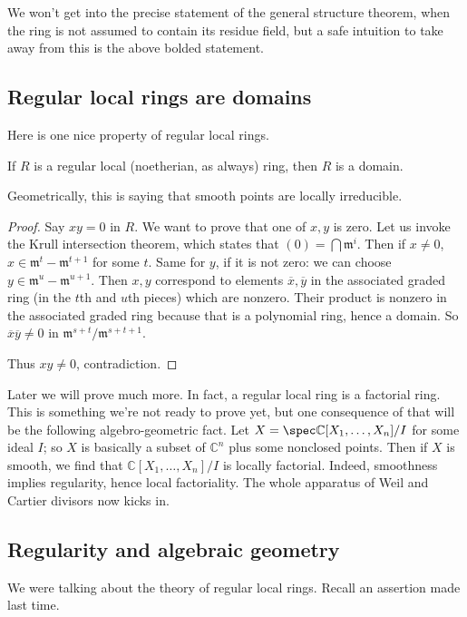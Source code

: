 We won't get into the precise statement of the general structure theorem, when
the ring is not assumed to contain its residue field, but a safe
intuition to take away from this is the above bolded statement.


\subsection{Regular local rings are domains}


Here is one nice property of regular local rings.

\begin{proposition} 
If $R$ is a regular local (noetherian, as always) ring, then $R$ is a domain.
\end{proposition} 

Geometrically, this is saying that smooth points are locally irreducible.
\begin{proof} 
Say $xy=0$ in $R$. We want to prove that one of $x,y$ is zero. Let us invoke
the Krull intersection theorem, which states that $(0) = \bigcap
\mathfrak{m}^i$. Then if $x \neq 0$, $x \in \mathfrak{m}^t -
\mathfrak{m}^{t+1}$ for some $t$. Same for $y$, if it is not zero: we can
choose $y \in \mathfrak{m}^u - \mathfrak{m}^{u+1}$. Then $x,y$ correspond to
elements $\overline{x}, \overline{y}$ in the associated graded ring (in the
$t$th and $u$th pieces) which are nonzero. Their product is nonzero in the
associated graded ring because that is a polynomial ring, hence a domain. So
$\overline{x} \overline{y} \neq 0$ in $\mathfrak{m}^{s+t}/\mathfrak{m}^{s+t+1}$.

Thus $xy \neq 0$, contradiction.

\end{proof} 

Later we will prove much more. In fact, a regular local ring is a factorial
ring. This is something we're not ready to prove yet, but one consequence of
that will be the following algebro-geometric fact. Let $X = \spec
\mathbb{C}[X_1, \dots, X_n]/I$ for some ideal $I$; so $X$ is basically a subset
of $\mathbb{C}^n$ plus some nonclosed points. Then if $X$ is smooth, we find
that $\mathbb{C}[X_1, \dots, X_n]/I$ is locally factorial. Indeed, smoothness
implies regularity, hence local factoriality. The whole apparatus of Weil and
Cartier divisors now kicks in.


\subsection{Regularity and algebraic geometry}
We were talking about the theory of regular local rings. Recall an assertion
made last time.

